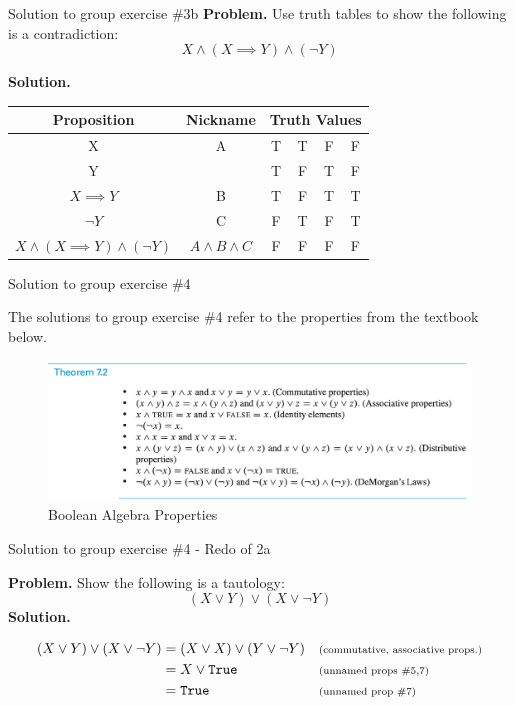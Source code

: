 \documentclass[10pt]{beamer}
\begin{document}
\begin{frame}{Solution to group exercise \#3b}
\footnotesize 
\textbf{Problem.} Use truth tables to show the following is a contradiction:
\[ X \land (X \implies Y) \land (\lnot Y) \]

\vfill 
\textbf{Solution.}
\begin{table}[h]
    \centering
    \begin{tabular}{c | c|c c c c}
        \toprule 
        \textbf{Proposition} & \textbf{Nickname}& \multicolumn{4}{c}{\textbf{Truth Values}} \\
        \midrule
        X &A&T&T&F&F\\
        Y &&T&F&T&F\\ 
        \midrule
        $X \implies Y$&B&T&F&T&T\\
        $\lnot Y$ &C &F&T&F&T \\
        \midrule 
        $X \land (X \implies Y) \land (\lnot Y)$ & $A \land B \land C$ &F&F&F&F \\
        \bottomrule
    \end{tabular}
\end{table}	
\end{frame}


\begin{frame}{Solution to group exercise \#4}
\footnotesize 

The solutions to group exercise \#4 refer to the properties from the textbook below. 
\vfill 
\begin{figure}[ht]
        \centering
        \includegraphics[width=\textwidth]{images/boolean_algebra_properties}
        \caption{Boolean Algebra Properties}
        \label{fig:bap}
\end{figure}
\end{frame}

\begin{frame}{Solution to group exercise \#4 - Redo of 2a}

\textbf{Problem.} Show the following is a  tautology:
\[ (X \lor Y) \lor (X \lor \lnot Y) \]
\vfill 
\textbf{Solution.}

\begin{align*}
(X \lor Y) \lor (X \lor \lnot Y) &= 	(X \lor X) \lor (Y \lor \lnot Y) && \text{\scriptsize{{(commutative, associative props.)}}} \\
&= X \lor \texttt{True} && \text{\scriptsize{{(unnamed props \#5,7)}}} \\
&= \texttt{True} && \text{\scriptsize{{(unnamed prop \#7)}}}
\end{align*}

\end{frame}
		
\end{document}
